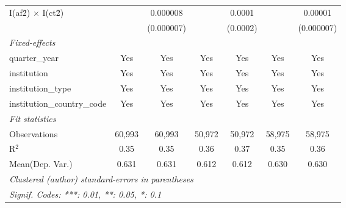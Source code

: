 \begin{tabular}{lcccccc}
   I(af\^2) $\times$ I(ct\^2)         &               & 0.000008      &               & 0.0001        &               & 0.00001\\   
                                      &               & (0.000007)    &               & (0.0002)      &               & (0.000007)\\   
   \midrule
   \emph{Fixed-effects}\\
   quarter\_year                      & Yes           & Yes           & Yes           & Yes           & Yes           & Yes\\  
   institution                        & Yes           & Yes           & Yes           & Yes           & Yes           & Yes\\  
   institution\_type                  & Yes           & Yes           & Yes           & Yes           & Yes           & Yes\\  
   institution\_country\_code         & Yes           & Yes           & Yes           & Yes           & Yes           & Yes\\  
   \midrule
   \emph{Fit statistics}\\
   Observations                       & 60,993        & 60,993        & 50,972        & 50,972        & 58,975        & 58,975\\  
   R$^2$                              & 0.35          & 0.35          & 0.36          & 0.37          & 0.35          & 0.36\\  
Mean(Dep. Var.) & 0.631 & 0.631 & 0.612 & 0.612 & 0.630 & 0.630 \\
   \midrule \midrule
   \multicolumn{7}{l}{\emph{Clustered (author) standard-errors in parentheses}}\\
   \multicolumn{7}{l}{\emph{Signif. Codes: ***: 0.01, **: 0.05, *: 0.1}}\\
\end{tabular}
\par\endgroup
